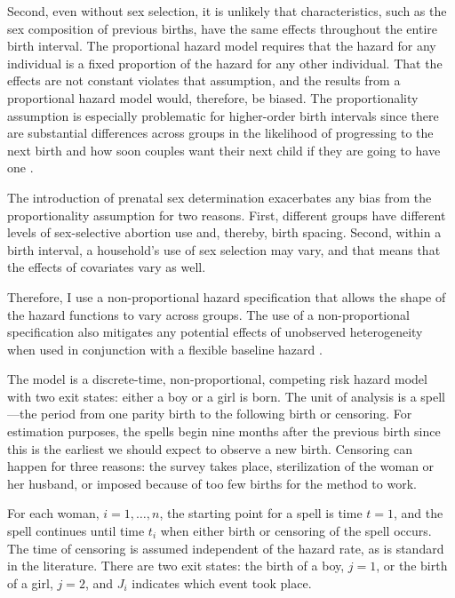\documentclass[12pt,letterpaper]{article}
\begin{document}
Second, even without sex selection, it is unlikely that characteristics, such as 
the sex composition of previous births, have the same effects throughout the entire 
birth interval. 
The proportional hazard model requires that the hazard for any individual is a 
fixed proportion of the hazard for any other individual. 
That the effects are not constant violates that assumption, and the results from a 
proportional hazard model would, therefore, be biased. 
The proportionality assumption is especially problematic for higher-order birth 
intervals since there are substantial differences across groups in the likelihood 
of progressing to the next birth and how soon couples want their next child if they 
are going to have one \citep{Whitworth2002,Bhalotra2008,Kim2010}.

The introduction of prenatal sex determination exacerbates any bias from
the proportionality assumption for two reasons. 
First, different groups have different levels of sex-selective abortion use and, thereby, 
birth spacing. 
Second, within a birth interval, a household's use of sex selection may vary, and that
means that the effects of covariates vary as well.

Therefore, I use a non-proportional hazard specification that allows the shape of the 
hazard functions to vary across groups.
The use of a non-proportional specification also mitigates any potential effects 
of unobserved heterogeneity when used in conjunction with a flexible baseline hazard 
\citep{Dolton1995}.

The model is a discrete-time, non-proportional, competing risk hazard model with two 
exit states: either a boy or a girl is born. 
The unit of analysis is a spell---the period from one parity birth to the following 
birth or censoring. 
For estimation purposes, the spells begin nine months after the previous birth since 
this is the earliest we should expect to observe a new birth. 
Censoring can happen for three reasons: the survey takes place, sterilization of the 
woman or her husband, or imposed because of too few births for the method to work.

For each woman, $i=1,\ldots,n$, the starting point for a spell is time $t=1$, and 
the spell continues until time $t_i$ when either birth or censoring of the spell 
occurs.
The time of censoring is assumed independent of the hazard rate,
as is standard in the literature.
There are two exit states: the birth of a boy, $j=1$, or the birth of a girl, $j=2$, and 
$J_i$ indicates which event took place.
\end{document}
